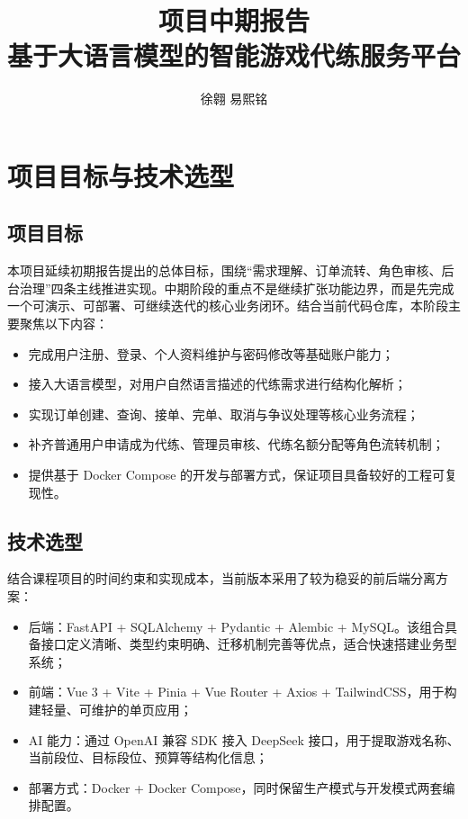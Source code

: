 ﻿\documentclass[12pt,a4paper]{ctexart}
\title{项目中期报告\\基于大语言模型的智能游戏代练服务平台}
\author{徐翱 \quad 易熙铭}
\date{}
\begin{document}
\maketitle
\tableofcontents
\newpage

\section{项目目标与技术选型}

\subsection{项目目标}
本项目延续初期报告提出的总体目标，围绕“需求理解、订单流转、角色审核、后台治理”四条主线推进实现。中期阶段的重点不是继续扩张功能边界，而是先完成一个可演示、可部署、可继续迭代的核心业务闭环。结合当前代码仓库，本阶段主要聚焦以下内容：

\begin{itemize}[leftmargin=2em]
  \item 完成用户注册、登录、个人资料维护与密码修改等基础账户能力；
  \item 接入大语言模型，对用户自然语言描述的代练需求进行结构化解析；
  \item 实现订单创建、查询、接单、完单、取消与争议处理等核心业务流程；
  \item 补齐普通用户申请成为代练、管理员审核、代练名额分配等角色流转机制；
  \item 提供基于 Docker Compose 的开发与部署方式，保证项目具备较好的工程可复现性。
\end{itemize}

\subsection{技术选型}
结合课程项目的时间约束和实现成本，当前版本采用了较为稳妥的前后端分离方案：

\begin{itemize}[leftmargin=2em]
  \item 后端：FastAPI + SQLAlchemy + Pydantic + Alembic + MySQL。该组合具备接口定义清晰、类型约束明确、迁移机制完善等优点，适合快速搭建业务型系统；
  \item 前端：Vue 3 + Vite + Pinia + Vue Router + Axios + TailwindCSS，用于构建轻量、可维护的单页应用；
  \item AI 能力：通过 OpenAI 兼容 SDK 接入 DeepSeek 接口，用于提取游戏名称、当前段位、目标段位、预算等结构化信息；
  \item 部署方式：Docker + Docker Compose，同时保留生产模式与开发模式两套编排配置。
\end{itemize}
\end{document}
